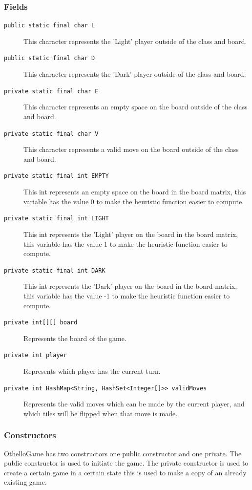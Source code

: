 \documentclass[a4paper]{article}
\begin{document}
\subsubsection{Fields}
\begin{description}
\item[\texttt{public static final char L}] This character represents the 'Light' player outside of the class and board.
\item[\texttt{public static final char D}] This character represents the 'Dark' player outside of the class and board.
\item[\texttt{private static final char E}] This character represents an empty space on the board outside of the class and board.
\item[\texttt{private static final char V}] This character represents a valid move on the board outside of the class and board.
\item[\texttt{private static final int EMPTY}] This int represents an empty space on the board in the board matrix, this variable has the value 0 to make the heuristic function easier to compute. 
\item[\texttt{private static final int LIGHT}] This int represents the 'Light' player on the board in the board matrix, this variable has the value 1 to make the heuristic function easier to compute. 
\item[\texttt{private static final int DARK}] This int represents the 'Dark' player on the board in the board matrix, this variable has the value -1 to make the heuristic function easier to compute. 
\item[\texttt{private int[][] board}] Represents the board of the game.
\item[\texttt{private int player}] Represents which player has the current turn.
\item[\texttt{private int HashMap<String, HashSet<Integer[]>> validMoves}] Represents the valid moves which can be made by the current player, and which tiles will be flipped when that move is made.
\end{description} 
\subsubsection{Constructors}
OthelloGame has two constructors one public constructor and one private. The public constructor is used to initiate the game. The private constructor is used to create a certain game in a certain state this is used to make a copy of an already existing game.
\end{document}
